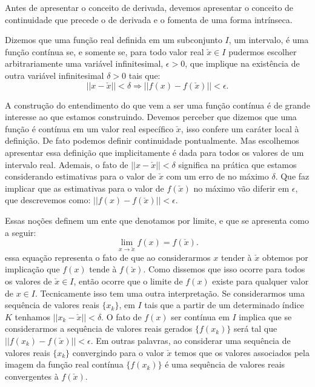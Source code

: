 \par Antes de apresentar o conceito de derivada, devemos apresentar o conceito de continuidade que precede o de derivada e o fomenta de uma forma intrínseca. 

\begin{definition}
  Dizemos que uma função real definida em um subconjunto $I$, um intervalo, é uma função contínua se, e somente se, para todo valor real $\check{x} \in I$ pudermos escolher arbitrariamente uma variável infinitesimal, $\epsilon > 0$, que implique na existência de outra variável infinitesimal $\delta>0$ tais que:
  $$||x - \check{x}|| < \delta \Rightarrow ||f(x) - f(\check{x})|| < \epsilon.$$ 
\end{definition}

\par A construção do entendimento do que vem a ser uma função contínua é de grande interesse ao que estamos construindo. Devemos perceber que dizemos que uma função é contínua em um valor real específico $\check{x}$, isso confere um caráter local à definição. De fato podemos definir continuidade pontualmente. Mas escolhemos apresentar essa definição que implicitamente é dada para todos os valores de um intervalo real. Ademais, o fato de $||x - \check{x}|| < \delta$ significa na prática que estamos considerando estimativas para o valor de $\check{x}$ com um erro de no máximo $\delta$. Que faz implicar que as estimativas para o valor de $f(\check{x})$ no máximo vão diferir em $\epsilon$, que descrevemos como: $||f(x) - f(\check{x})|| < \epsilon$.

\par Essas noções definem um ente que denotamos por limite, e que se apresenta como a seguir:
$$\lim_{x \rightarrow \check{x}}f(x)= f(\check{x}).$$
essa equação representa o fato de que ao considerarmos $x$ tender à $\check{x}$ obtemos por implicação que $f(x)$ tende à $f(\check{x})$. Como dissemos que isso ocorre para todos os valores de $\check{x} \in I$, então ocorre que o limite de $f(x)$ existe para qualquer valor de $x \in I$. Tecnicamente isso tem uma outra interpretação. Se considerarmos uma sequência de valores reais $\{x_k\}$, em $I$ tais que a partir de um determinado índice $K$ tenhamos $||x_k - \check{x}|| < \delta$. O fato de $f(x)$ ser contínua em $I$ implica que se considerarmos a sequência de valores reais gerados $\{f(x_k)\}$ será tal que $||f(x_k) - f(\check{x})|| < \epsilon$. Em outras palavras, ao considerar uma sequência de valores reais $\{x_k\}$ convergindo para o valor $\check{x}$ temos que os valores associados pela imagem da função real contínua $\{f(x_k)\}$ é uma sequência de valores reais convergentes à $f(\check{x})$.

